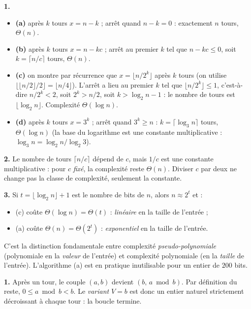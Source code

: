 \documentclass[11pt,a4paper]{article}
\begin{document}
\reponse
\textbf{1.}
\begin{itemize}[leftmargin=*,itemsep=2pt]
  \item \textbf{(a)} après $k$ tours $x = n-k$ ; arrêt quand $n-k=0$ :
        exactement $n$ tours, $\Theta(n)$.
  \item \textbf{(b)} après $k$ tours $x=n-kc$ ; arrêt au premier $k$ tel que $n-kc\le0$,
        soit $k=\lceil n/c\rceil$ tours, $\Theta(n)$.
  \item \textbf{(c)} on montre par récurrence que $x = \lfloor n/2^{k}\rfloor$ après
        $k$ tours (on utilise $\big\lfloor\lfloor n/2\rfloor/2\big\rfloor=\lfloor n/4\rfloor$).
        L'arrêt a lieu au premier $k$ tel que $\lfloor n/2^{k}\rfloor \le 1$, c'est-à-dire
        $n/2^{k}<2$, soit $2^{k}>n/2$, soit $k>\log_2 n-1$ :
        le nombre de tours est $\lfloor \log_2 n\rfloor$. Complexité $\Theta(\log n)$.
  \item \textbf{(d)} après $k$ tours $x=3^{k}$ ; arrêt quand $3^{k}\ge n$ :
        $k=\lceil\log_3 n\rceil$ tours, $\Theta(\log n)$ (la base du logarithme est une
        constante multiplicative : $\log_3 n = \log_2 n/\log_2 3$).
\end{itemize}

\textbf{2.} Le nombre de tours $\lceil n/c\rceil$ dépend de $c$, mais $1/c$ est une
constante multiplicative : pour $c$ \emph{fixé}, la complexité reste $\Theta(n)$.
Diviser $c$ par deux ne change pas la classe de complexité, seulement la constante.

\textbf{3.} Si $t=\lfloor\log_2 n\rfloor+1$ est le nombre de bits de $n$, alors
$n\approx 2^{t}$ et :
\begin{itemize}[leftmargin=*,itemsep=1pt]
  \item (c) coûte $\Theta(\log n) = \Theta(t)$ : \emph{linéaire} en la taille de l'entrée ;
  \item (a) coûte $\Theta(n) = \Theta(2^{t})$ : \emph{exponentiel} en la taille de
        l'entrée.
\end{itemize}
C'est la distinction fondamentale entre complexité \emph{pseudo-polynomiale} (polynomiale
en la \emph{valeur} de l'entrée) et complexité polynomiale (en la \emph{taille} de
l'entrée). L'algorithme (a) est en pratique inutilisable pour un entier de $200$ bits.

\reponse
\textbf{1.} Après un tour, le couple $(a,b)$ devient $(b,\,a\bmod b)$. Par définition du
reste, $0\le a\bmod b< b$. Le \emph{variant} $V = b$ est donc un entier naturel
strictement décroissant à chaque tour : la boucle termine.
\end{document}
